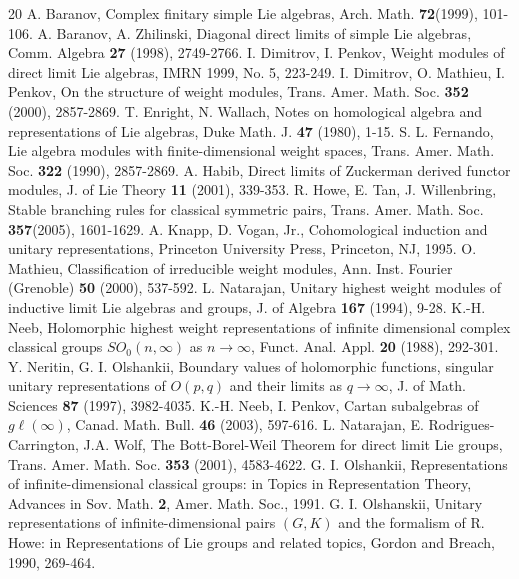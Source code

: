 \documentclass[12pt]{article}
\newcommand{\gl}{{g\ell}}
\begin{document}

\begin{thebibliography}{20}
 A. Baranov, Complex finitary simple Lie algebras, Arch. Math. \textbf{72}(1999), 101-106.
 A. Baranov, A. Zhilinski, Diagonal direct limits of simple Lie algebras, Comm. Algebra \textbf{27} (1998), 2749-2766.
 I. Dimitrov, I. Penkov, Weight modules of direct limit Lie algebras, IMRN 1999, No. 5, 223-249.
 I. Dimitrov, O. Mathieu, I. Penkov, On the structure of weight modules, Trans. Amer. Math. Soc. \textbf{352} (2000), 2857-2869.
 T. Enright, N. Wallach, Notes on homological algebra and representations of Lie algebras, Duke Math. J. {\bf{47}} (1980), 1-15.
 S. L. Fernando, Lie algebra modules with finite-dimensional weight spaces, Trans. Amer. Math. Soc. {\bf 322} (1990), 2857-2869.
 A. Habib, Direct limits of Zuckerman derived functor modules, J. of Lie Theory {\bf 11} (2001), 339-353.
 R. Howe, E. Tan, J. Willenbring, Stable branching rules for classical symmetric pairs, Trans. Amer. Math. Soc. \textbf{357}(2005), 1601-1629.
 A. Knapp, D. Vogan, Jr., Cohomological induction and unitary representations, Princeton University Press, Princeton, NJ, 1995.
 O. Mathieu, Classification of irreducible weight modules, Ann. Inst. Fourier (Grenoble) \textbf{50} (2000), 537-592.
 L. Natarajan, Unitary highest weight modules of inductive limit Lie algebras and groups, J. of Algebra {\bf 167} (1994), 9-28.
 K.-H. Neeb, Holomorphic highest weight representations of infinite dimensional complex classical groups $SO_0(n,\infty)$ as $n\to\infty$, Funct. Anal. Appl. \textbf{20} (1988), 292-301.
 Y. Neritin, G. I. Olshankii, Boundary values of holomorphic functions, singular unitary representations of $O(p,q)$ and their limits as $q\to\infty$, J. of Math. Sciences {\bf 87} (1997), 3982-4035.
 K.-H. Neeb, I. Penkov, Cartan subalgebras of $\gl(\infty)$, Canad. Math. Bull. \textbf{46} (2003), 597-616.
 L. Natarajan, E. Rodrigues-Carrington, J.A. Wolf, The Bott-Borel-Weil Theorem for direct limit Lie groups, Trans. Amer. Math. Soc. \textbf{353} (2001), 4583-4622.
 G. I. Olshankii,  Representations of infinite-dimensional classical groups: in Topics in Representation Theory, Advances in Sov. Math. {\bf 2},  Amer. Math. Soc., 1991.
 G. I. Olshanskii, Unitary representations of infinite-dimensional pairs $(G,K)$ and the formalism of R. Howe: in Representations of Lie groups and related topics, Gordon and Breach, 1990, 269-464.

\end{thebibliography}
\end{document}
